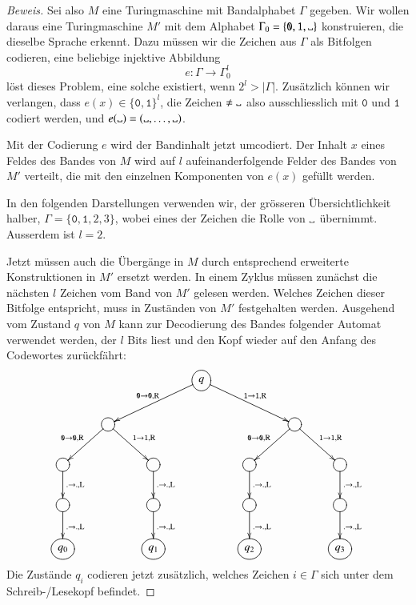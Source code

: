 \begin{proof}[Beweis]
Sei also $M$ eine Turingmaschine mit Bandalphabet $\Gamma$ gegeben. Wir
wollen daraus eine Turingmaschine $M'$ mit dem Alphabet
$\Gamma_0= \{\texttt{0},\texttt{1},\blank\}$ konstruieren, die dieselbe
Sprache erkennt. Dazu müssen wir die Zeichen aus $\Gamma$ als
Bitfolgen codieren, eine beliebige injektive Abbildung
\[
e\colon\Gamma\to \Gamma_0^l
\]
löst dieses Problem, eine solche existiert, wenn $2^l>|\Gamma|$.
Zusätzlich können
wir verlangen, dass $e(x)\in \{\texttt{0},\texttt{1}\}^l$, die Zeichen $\ne\blank$
also ausschliesslich mit $\texttt{0}$ und $\texttt{1}$ codiert werden, und
$e(\blank)=(\blank,\dots,\blank)$.

Mit der Codierung $e$ wird der Bandinhalt jetzt umcodiert. Der Inhalt
$x$
eines Feldes des Bandes von $M$ wird auf $l$ aufeinanderfolgende Felder
des Bandes von $M'$ verteilt, die mit den einzelnen Komponenten
von $e(x)$ gefüllt werden.

In den folgenden Darstellungen verwenden wir, der grösseren
Übersichtlichkeit halber, $\Gamma=\{\texttt{0},\texttt{1},2,3\}$, wobei eines der
Zeichen die Rolle von $\blank$ übernimmt. Ausserdem ist $l=2$.

Jetzt müssen auch die Übergänge in $M$
durch entsprechend erweiterte Konstruktionen in $M'$ ersetzt werden.
In einem Zyklus müssen zunächst die nächsten $l$ Zeichen vom Band
von $M'$ gelesen werden. Welches Zeichen dieser Bitfolge entspricht,
muss in Zuständen von $M'$ festgehalten werden. Ausgehend vom Zustand
$q$ von $M$ kann zur Decodierung
des Bandes folgender Automat verwendet werden, der $l$ Bits liest
und den Kopf wieder auf den Anfang des Codewortes zurückfährt:
\[
\entrymodifiers={++[o][F]}
\xymatrix{
*+\txt{}
	&*+\txt{}
		&*+\txt{}
			&q\ar[dll]_{\texttt{0}\to \texttt{0},\text{R}} \ar[drr]^{\texttt{1}\to \texttt{1},\text{R}}
\\
*+\txt{}
	&\ar[dl]_{\texttt{0}\to \texttt{0},\text{R}} \ar[dr]^{\texttt{1}\to \texttt{1},\text{R}}
		&*+\txt{}
			&*+\txt{}
				&*+\txt{}
					&\ar[dl]_{\texttt{0}\to \texttt{0},\text{R}} \ar[dr]^{\texttt{1}\to \texttt{1},\text{R}}
						&*+\txt{}
\\
\ar[d]^{.\to .,\text{L}}
	&*+\txt{}
		&\ar[d]^{.\to .,\text{L}}
			&*+\txt{}
				&\ar[d]^{.\to .,\text{L}}
					&*+\txt{}
						&\ar[d]^{.\to .,\text{L}}
\\
\ar[d]^{.\to .,\text{L}}
	&*+\txt{}
		&\ar[d]^{.\to .,\text{L}}
			&*+\txt{}
				&\ar[d]^{.\to .,\text{L}}
					&*+\txt{}
						&\ar[d]^{.\to .,\text{L}}
\\
q_0
	&*+\txt{}
		&q_1
			&*+\txt{}
				&q_2
					&*+\txt{}
						&q_3
}
\]
Die Zustände $q_i$ codieren jetzt zusätzlich, welches
Zeichen $i\in\Gamma$ sich unter dem Schreib-/Lesekopf befindet.


\end{proof}
